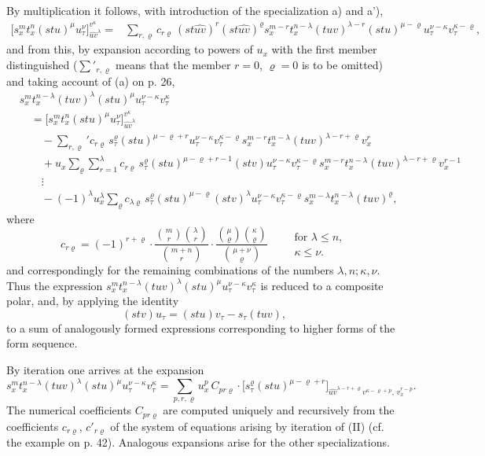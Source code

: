 \documentclass[11pt]{article}
\begin{document}
By multiplication it follows, with introduction of the specialization a) and a'),
\[
\begin{aligned}
\bigl[s_x^m t_x^n(stu)^\mu u_\tau^\nu\bigr]_{\widehat{uv}^{\lambda}}^{v^\kappa}
={}&
\sum_{r,\varrho}c_{r\varrho}\,
(st\widehat{uv})^r(st\widehat{uv})^\varrho
s_x^{m-r}t_x^{n-\lambda}(tuv)^{\lambda-r}(stu)^{\mu-\varrho}
u_\tau^{\nu-\kappa}v_\tau^{\kappa-\varrho},
\end{aligned}
\]
and from this, by expansion according to powers of $u_x$ with the first member distinguished ($\sum'_{r,\varrho}$ means that the member $r=0$, $\varrho=0$ is to be omitted) and taking account of (a) on p. 26,
\[
\tag{II}
\begin{aligned}
&s_x^m t_x^{n-\lambda}(tuv)^\lambda(stu)^\mu u_\tau^{\nu-\kappa}v_\tau^\kappa\\
&\quad =
\bigl[s_x^m t_x^n(stu)^\mu u_\tau^\nu\bigr]_{\widehat{uv}^{\lambda}}^{v^\kappa}\\
&\qquad
-\sum_{r,\varrho}' c_{r\varrho}\,s_\tau^\varrho(stu)^{\mu-\varrho+r}
u_\tau^{\nu-\kappa}v_\tau^{\kappa-\varrho}
s_x^{m-r}t_x^{n-\lambda}(tuv)^{\lambda-r+\varrho}v_x^r\\
&\qquad
+u_x\sum_{\varrho}\sum_{r=1}^{\lambda} c_{r\varrho}\,
s_\tau^\varrho(stu)^{\mu-\varrho+r-1}(stv)
u_\tau^{\nu-\kappa}v_\tau^{\kappa-\varrho}
s_x^{m-r}t_x^{n-\lambda}(tuv)^{\lambda-r+\varrho}v_x^{r-1}\\
&\qquad
\vdots\\
&\qquad
-(-1)^\lambda u_x^\lambda\sum_\varrho c_{\lambda\varrho}\,
s_\tau^\varrho(stu)^{\mu-\varrho}(stv)^\lambda
u_\tau^{\nu-\kappa}v_\tau^{\kappa-\varrho}
s_x^{m-\lambda}t_x^{n-\lambda}(tuv)^\varrho,
\end{aligned}
\]
where
\[
c_{r\varrho}=(-1)^{r+\varrho}\cdot
\frac{\binom{m}{r}\binom{\lambda}{r}}{\binom{m+n}{r}}\cdot
\frac{\binom{\mu}{\varrho}\binom{\kappa}{\varrho}}{\binom{\mu+\nu}{\varrho}}
\qquad
\begin{array}{l}
\text{for }\lambda\le n,\\
\kappa\le\nu.
\end{array}
\]
and correspondingly for the remaining combinations of the numbers $\lambda,n;\kappa,\nu$. Thus the expression $s_x^m t_x^{n-\lambda}(tuv)^\lambda(stu)^\mu u_\tau^{\nu-\kappa}v_\tau^\kappa$ is reduced to a composite polar, and, by applying the identity
\[
(stv)u_\tau=(stu)v_\tau-s_\tau(tuv),
\]
to a sum of analogously formed expressions corresponding to higher forms of the form sequence.

By iteration one arrives at the expansion
\[
\tag{III}
s_x^m t_x^{n-\lambda}(tuv)^\lambda(stu)^\mu u_\tau^{\nu-\kappa}v_\tau^\kappa
=
\sum_{p,r,\varrho}u_x^p\,C_{pr\varrho}\cdot
\bigl[s_\tau^\varrho(stu)^{\mu-\varrho+r}\bigr]_{\widehat{uv}^{\lambda-r+\varrho}v^{\kappa-\varrho+p},\,v_x^{r-p}}.
\]
The numerical coefficients $C_{pr\varrho}$ are computed uniquely and recursively from the coefficients $c_{r\varrho}$, $c'_{r\varrho}$ of the system of equations arising by iteration of (II) (cf. the example on p. 42). Analogous expansions arise for the other specializations.
\end{document}
